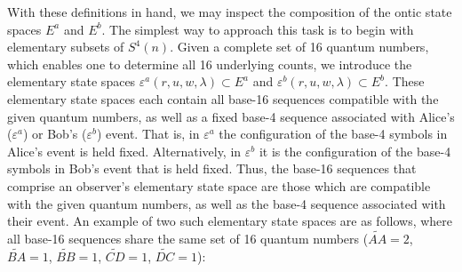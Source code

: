 \documentclass{article}
\begin{document}
With these definitions in hand, we may inspect the composition of the ontic state spaces $E^a$ and $E^b$. The simplest way to approach this task is to begin with elementary subsets of $S^4(n)$. Given a complete set of 16 quantum numbers, which enables one to determine all 16 underlying counts, we introduce the elementary state spaces $\varepsilon^a(r,u,w,\lambda)\subset E^a$ and $\varepsilon^b(r,u,w,\lambda)\subset E^b$. These elementary state spaces each contain all base-16 sequences compatible with the given quantum numbers, as well as a fixed base-4 sequence associated with Alice's ($\varepsilon^a$) or Bob's ($\varepsilon^b$) event. That is, in $\varepsilon^a$ the configuration of the base-4 symbols in Alice's event is held fixed. Alternatively, in $\varepsilon^b$ it is the configuration of the base-4 symbols in Bob's event that is held fixed. Thus, the base-16 sequences that comprise an observer's elementary state space are those which are compatible with the given quantum numbers, as well as the base-4 sequence associated with their event. An example of two such elementary state spaces are as follows, where all base-16 sequences share the same set of 16 quantum numbers ($\widetilde{AA}=2$, $\widetilde{BA}=1$, $\widetilde{BB}=1$, $\widetilde{CD}=1$, $\widetilde{DC}=1$): 
\end{document}
